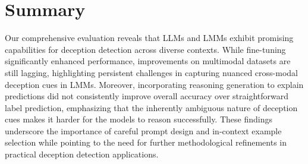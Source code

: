 \section{Summary}
Our comprehensive evaluation reveals that LLMs and LMMs exhibit promising capabilities for deception detection across diverse contexts. While fine-tuning significantly enhanced performance, improvements on multimodal datasets are still lagging, highlighting persistent challenges in capturing nuanced cross-modal deception cues in LMMs. Moreover, incorporating reasoning generation to explain predictions did not consistently improve overall accuracy over straightforward label prediction, emphasizing that the inherently ambiguous nature of deception cues makes it harder for the models to reason successfully. These findings underscore the importance of careful prompt design and in-context example selection while pointing to the need for further methodological refinements in practical deception detection applications.